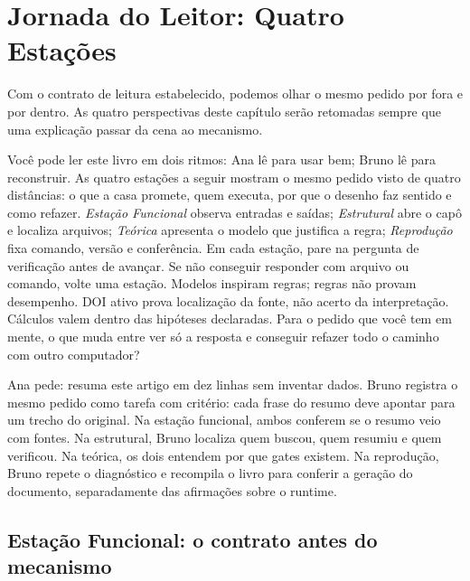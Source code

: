 \chapter{Jornada do Leitor: Quatro Esta\c{c}\~oes}

Com o contrato de leitura estabelecido, podemos olhar o mesmo pedido por fora e por dentro. As quatro perspectivas deste capítulo serão retomadas sempre que uma explicação passar da cena ao mecanismo.


\roteirodidatico
{Voc\^e pode ler este livro em dois ritmos: Ana l\^e para usar bem; Bruno l\^e para reconstruir. As quatro esta\c{c}\~oes a seguir mostram o mesmo pedido visto de quatro dist\^ancias: o que a casa promete, quem executa, por que o desenho faz sentido e como refazer.}
{\emph{Esta\c{c}\~ao Funcional} observa entradas e sa\'idas; \emph{Estrutural} abre o cap\^o e localiza arquivos; \emph{Te\'orica} apresenta o modelo que justifica a regra; \emph{Reprodu\c{c}\~ao} fixa comando, vers\~ao e confer\^encia.}
{Em cada esta\c{c}\~ao, pare na pergunta de verifica\c{c}\~ao antes de avan\c{c}ar. Se n\~ao conseguir responder com arquivo ou comando, volte uma esta\c{c}\~ao.}
{Modelos inspiram regras; regras n\~ao provam desempenho. DOI ativo prova localiza\c{c}\~ao da fonte, n\~ao acerto da interpreta\c{c}\~ao. C\'alculos valem dentro das hip\'oteses declaradas.}
{Para o pedido que voc\^e tem em mente, o que muda entre ver s\'o a resposta e conseguir refazer todo o caminho com outro computador?}

{Ana pede: resuma este artigo em dez linhas sem inventar dados. Bruno registra o mesmo pedido como tarefa com crit\'erio: cada frase do resumo deve apontar para um trecho do original. Na esta\c{c}\~ao funcional, ambos conferem se o resumo veio com fontes. Na estrutural, Bruno localiza quem buscou, quem resumiu e quem verificou. Na te\'orica, os dois entendem por que gates existem. Na reprodu\c{c}\~ao, Bruno repete o diagn\'ostico e recompila o livro para conferir a gera\c{c}\~ao do documento, separadamente das afirma\c{c}\~oes sobre o runtime.}

\section{Esta\c{c}\~ao Funcional: o contrato antes do mecanismo}

